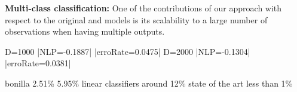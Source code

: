 \textbf{Multi-class classification:} One of the contributions of our approach with respect 
to the original \egp and \ugp models is its scalability to a large number of observations 
when having multiple outputs. 

D=1000	|NLP=-0.1887|	|erroRate=0.0475|	D=2000	|NLP=-0.1304|	|erroRate=0.0381|


bonilla 2.51\%
\cite{gal-et-al-nips-2014} 5.95\%
linear classifiers around 12\%
state of the art less than 1\%










